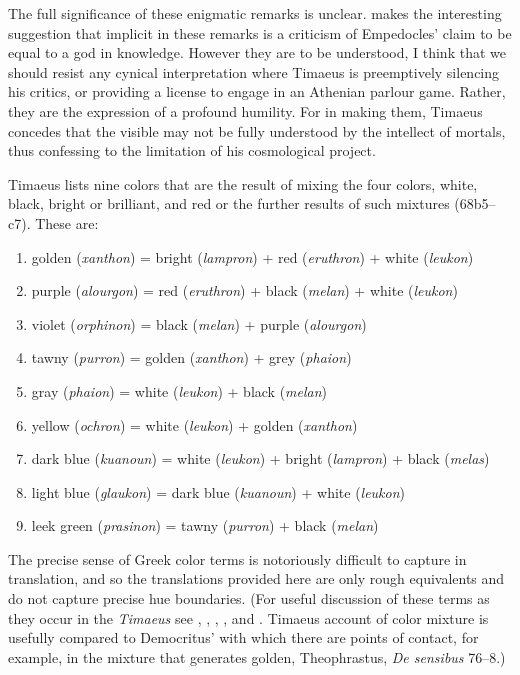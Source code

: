The full significance of these enigmatic remarks is unclear. \citet[173--4]{Brisson:1997qr} makes the interesting suggestion that implicit in these remarks is a criticism of Empedocles' claim to be equal to a god in knowledge. However they are to be understood, I think that we should resist any cynical interpretation where Timaeus is preemptively silencing his critics, or providing a license to engage in an Athenian parlour game. Rather, they are the expression of a profound humility. For in making them, Timaeus concedes that the visible may not be fully understood by the intellect of mortals, thus confessing to the limitation of his cosmological project.

Timaeus lists nine colors that are the result of mixing the four colors, white, black, bright or brilliant, and red or the further results of such mixtures (68b5--c7). These are:
\begin{enumerate}
	\item golden (\emph{xanthon}) = bright (\emph{lampron}) + red (\emph{eruthron}) + white (\emph{leukon})
	\item purple (\emph{alourgon}) = red (\emph{eruthron}) + black (\emph{melan}) + white (\emph{leukon})
	\item violet (\emph{orphinon}) = black (\emph{melan}) + purple (\emph{alourgon})
	\item tawny (\emph{purron}) = golden (\emph{xanthon}) + grey (\emph{phaion})
	\item gray (\emph{phaion}) = white (\emph{leukon}) + black (\emph{melan})
	\item yellow (\emph{ochron}) = white (\emph{leukon}) + golden (\emph{xanthon})
	\item dark blue (\emph{kuanoun}) = white (\emph{leukon}) + bright (\emph{lampron}) + black (\emph{melas})
	\item light blue (\emph{glaukon}) = dark blue (\emph{kuanoun}) + white (\emph{leukon})
	\item leek green (\emph{prasinon}) = tawny (\emph{purron}) + black (\emph{melan})
\end{enumerate}
The precise sense of Greek color terms is notoriously difficult to capture in translation, and so the translations provided here are only rough equivalents and do not capture precise hue boundaries. (For useful discussion of these terms as they occur in the \emph{Timaeus} see \citet{Platnauer:1921bh}, \citet[483--5]{Taylor:1928qb}, \citet[chapter 10]{Bruno:1977fk}, \citet{Levides:2002aa}, and \citet{Struycken:2003zr}. Timaeus account of color mixture is usefully compared to Democritus' with which there are points of contact, for example, in the mixture that generates golden, Theophrastus, \emph{De sensibus} 76--8.)

